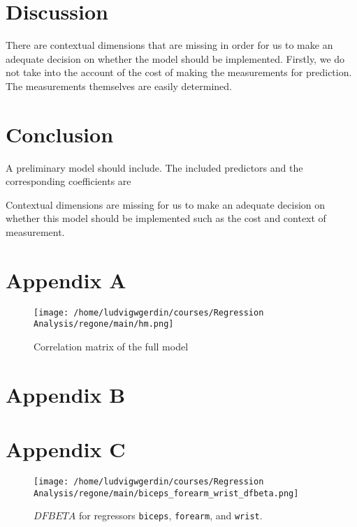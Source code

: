 \documentclass[11pt]{article}
\begin{document}


\newpage
\section{Discussion}
\label{sec:org9f19a84}

There are contextual dimensions that are missing in order for us to make an adequate decision on whether 
the model should be implemented. Firstly, we do not take into the account of the cost of making the 
measurements for prediction. The measurements themselves are easily determined.

\section{Conclusion}
\label{sec:org920c7d7}

A preliminary model should include. The included predictors and the corresponding coefficients are 

Contextual dimensions are missing for us to make an adequate decision on whether this model should be implemented
such as the cost and context of measurement.

\section{Appendix A}
\label{sec:org0747829}

\begin{figure}[H]
\centering
\texttt{[image: /home/ludvigwgerdin/courses/Regression Analysis/regone/main/hm.png]}
\caption{\label{fig:orga1aa088}
Correlation matrix of the full model}
\end{figure}

\newpage

\section{Appendix B}
\label{sec:orgfeaf7b6}





\newpage  

\section{Appendix C}
\label{sec:org0c0b78e}

\begin{figure}[H]
\centering
\texttt{[image: /home/ludvigwgerdin/courses/Regression Analysis/regone/main/biceps\_forearm\_wrist\_dfbeta.png]}
\caption{\label{fig:org3cfd79f}
\(DFBETA\) for regressors \texttt{biceps}, \texttt{forearm}, and \texttt{wrist}.}
\end{figure}
\end{document}
